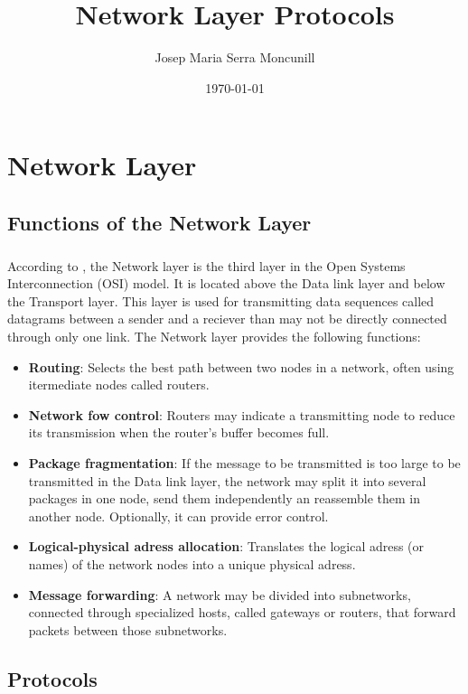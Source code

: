 \documentclass[12pt,a4paper]{report}
\author{Josep Maria Serra Moncunill}
\title{Network Layer Protocols}
\date{\today}
\begin{document}
\maketitle
\tableofcontents
\listoffigures
\listoftables

\chapter{Network Layer}

\section{Functions of the Network Layer}
\paragraph{}According to \cite{X200}, the Network layer is the third layer in the Open Systems Interconnection (OSI) model. It is located above the Data link layer and below the Transport layer. This layer is used for transmitting data sequences called datagrams between a sender and a reciever than may not be directly connected through only one link. The Network layer provides the following functions:
\begin{itemize}
\item \textbf{Routing}: Selects the best path between two nodes in a network, often using itermediate nodes called routers.
\item \textbf{Network fow control}: Routers may indicate a transmitting node to reduce its transmission when the router's buffer becomes full.
\item \textbf{Package fragmentation}: If the message to be transmitted is too large to be transmitted in the Data link layer, the network may split it into several packages in one node, send them independently an reassemble them in another node. Optionally, it can provide error control.
\item \textbf{Logical-physical adress allocation}: Translates the logical adress (or names) of the network nodes into a unique physical adress.
\item \textbf{Message forwarding}: A network may be divided into subnetworks, connected through specialized hosts, called gateways or routers, that forward packets between those subnetworks.
\end{itemize}

\section{Protocols}
\end{document}
